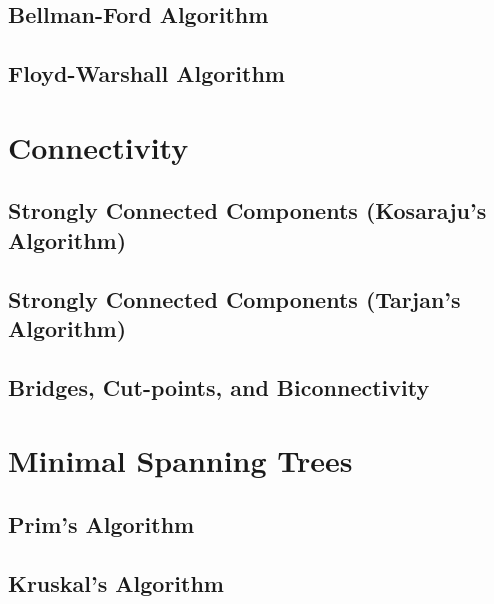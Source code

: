 \subsection{Bellman-Ford Algorithm}

\subsection{Floyd-Warshall Algorithm}


\section{Connectivity}
\setcounter{section}{3}
\setcounter{subsection}{0}
\subsection{Strongly Connected Components (Kosaraju's Algorithm)}

\subsection{Strongly Connected Components (Tarjan's Algorithm)}

\subsection{Bridges, Cut-points, and Biconnectivity}


\section{Minimal Spanning Trees}
\setcounter{section}{4}
\setcounter{subsection}{0}
\subsection{Prim's Algorithm}

\subsection{Kruskal's Algorithm}


